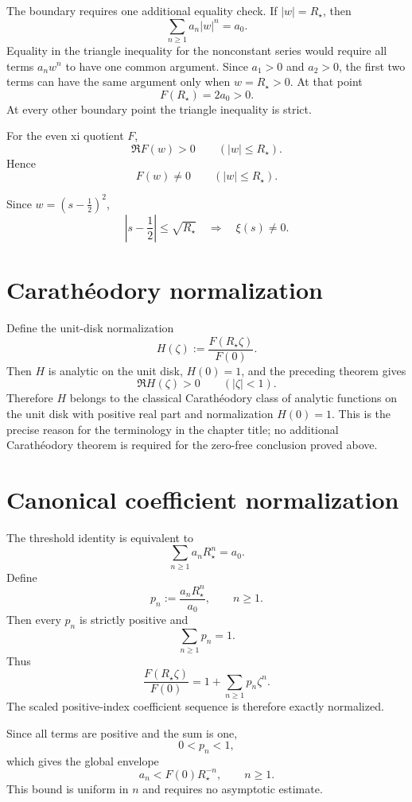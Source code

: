The boundary requires one additional equality check. If $|w|=R_\star$, then
\[
 \sum_{n\ge1}a_n|w|^n=a_0.
\]
Equality in the triangle inequality for the nonconstant series would require all terms $a_nw^n$ to have one common argument. Since $a_1>0$ and $a_2>0$, the first two terms can have the same argument only when $w=R_\star>0$. At that point
\[
 F(R_\star)=2a_0>0.
\]
At every other boundary point the triangle inequality is strict.

\begin{theorem}
For the even xi quotient $F$,
\[
 \boxed{\Re F(w)>0\qquad(|w|\le R_\star).}
\]
Hence
\[
 \boxed{F(w)\ne0\qquad(|w|\le R_\star).}
\]
\end{theorem}

\begin{corollary}
Since $w=(s-\tfrac12)^2$,
\[
 \boxed{
 \left|s-\frac12\right|\le\sqrt{R_\star}
 \quad\Longrightarrow\quad
 \xi(s)\ne0.
 }
\]
\end{corollary}

\section{Carath\'eodory normalization}

Define the unit-disk normalization
\[
 \boxed{
 H(\zeta):=\frac{F(R_\star\zeta)}{F(0)}.
 }
\]
Then $H$ is analytic on the unit disk, $H(0)=1$, and the preceding theorem gives
\[
 \boxed{\Re H(\zeta)>0\qquad(|\zeta|<1).}
\]
Therefore $H$ belongs to the classical Carath\'eodory class of analytic functions on the unit disk with positive real part and normalization $H(0)=1$. This is the precise reason for the terminology in the chapter title; no additional Carath\'eodory theorem is required for the zero-free conclusion proved above.

\section{Canonical coefficient normalization}

The threshold identity is equivalent to
\[
 \sum_{n\ge1}a_nR_\star^n=a_0.
\]
Define
\[
 p_n:=\frac{a_nR_\star^n}{a_0},
 \qquad n\ge1.
\]
Then every $p_n$ is strictly positive and
\[
 \boxed{\sum_{n\ge1}p_n=1.}
\]
Thus
\[
 \boxed{
 \frac{F(R_\star\zeta)}{F(0)}
 =1+\sum_{n\ge1}p_n\zeta^n.
 }
\]
The scaled positive-index coefficient sequence is therefore exactly normalized.

Since all terms are positive and the sum is one,
\[
 0<p_n<1,
\]
which gives the global envelope
\[
 \boxed{
 a_n<F(0)R_\star^{-n},
 \qquad n\ge1.
 }
\]
This bound is uniform in $n$ and requires no asymptotic estimate.

